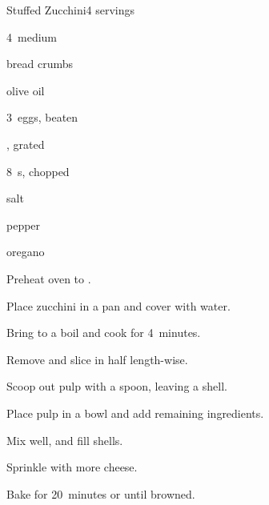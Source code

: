 \begin{recipe}{Stuffed Zucchini}{}{4 servings}

\begin{ingredients}
\item 4~medium 
\item \C{\half} bread crumbs
\item {} olive oil
\item 3~eggs, beaten
\item \C{\half} , grated
\item 8~s, chopped
\item salt
\item pepper
\item oregano
\end{ingredients}

\begin{directions}
\item Preheat oven to .
\item Place zucchini in a pan and cover with water.
\item Bring to a boil and cook for 4~minutes.
\item Remove and slice in half length-wise.
\item Scoop out pulp with a spoon, leaving a shell.
\item Place pulp in a bowl and add remaining ingredients.
\item Mix well, and fill shells.
\item Sprinkle with more cheese.
\item Bake for 20~minutes or until browned.
\end{directions}

\end{recipe}

